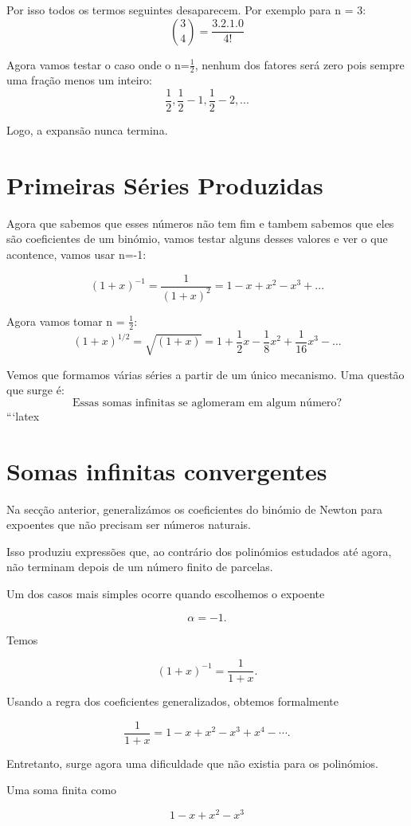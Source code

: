 \documentclass[12pt,a4paper]{article}
\begin{document}
Por isso todos os termos seguintes desaparecem. Por exemplo para n = 3:
    \[\binom{3}{4} = \frac{3.2.1.0}{4!}\]

Agora vamos testar o caso onde o n=$\frac{1}{2}$, nenhum dos fatores será zero pois sempre uma fração menos um inteiro:
    \[\frac{1}{2}, \frac{1}{2}-1, \frac{1}{2}-2, ...\]

Logo, a expansão nunca termina.

\section{Primeiras Séries Produzidas}

Agora que sabemos que esses números não tem fim e tambem sabemos que eles são coeficientes de um binómio, vamos testar alguns 
desses valores e ver o que acontence, vamos usar n=-1:

    \[(1+x)^{-1} = \frac{1}{(1+x)^2} = 1 - x + x^2 - x^3 + ...\]

Agora vamos tomar n = $\frac{1}{2}$:
    \[(1+x)^{1/2} = \sqrt{(1+x)} = 1 + \frac{1}{2}x - \frac{1}{8}x^2 + \frac{1}{16}x^3 - ...\]

Vemos que formamos várias séries a partir de um único mecanismo. 
Uma questão que surge é:
    \[\text{Essas somas infinitas se aglomeram em algum número?}\]
```latex
\section{Somas infinitas convergentes}

Na secção anterior, generalizámos os coeficientes do binómio de Newton
para expoentes que não precisam ser números naturais.

Isso produziu expressões que, ao contrário dos polinómios estudados até
agora, não terminam depois de um número finito de parcelas.

Um dos casos mais simples ocorre quando escolhemos o expoente

\[
\alpha=-1.
\]

Temos

\[
(1+x)^{-1}=\frac{1}{1+x}.
\]

Usando a regra dos coeficientes generalizados, obtemos formalmente

\[
\frac{1}{1+x}
=
1-x+x^2-x^3+x^4-\cdots.
\]

Entretanto, surge agora uma dificuldade que não existia para os
polinómios.

Uma soma finita como

\[
1-x+x^2-x^3
\]
\end{document}
